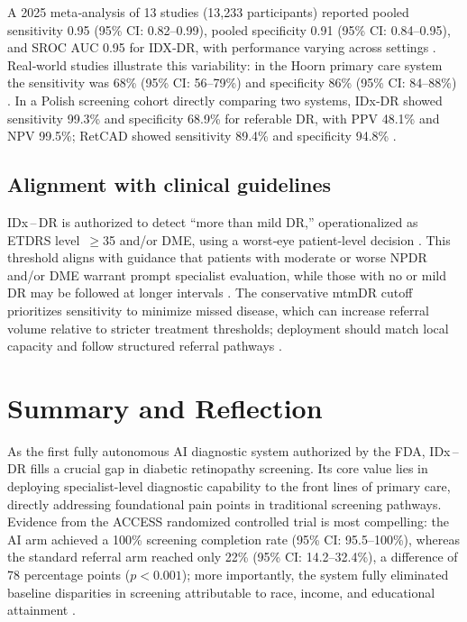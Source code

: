 \documentclass[sigconf]{acmart}
\begin{document}
A 2025 meta‐analysis of 13 studies (13{,}233 participants) reported pooled sensitivity 0.95 (95\% CI: 0.82–0.99), pooled specificity 0.91 (95\% CI: 0.84–0.95), and SROC AUC 0.95 for IDX‐DR, with performance varying across settings \citep{Khan2025AJO}. Real‐world studies illustrate this variability: in the Hoorn primary care system the sensitivity was 68\% (95\% CI: 56–79\%) and specificity 86\% (95\% CI: 84–88\%) \citep{vanDerHeijden2018Acta}. In a Polish screening cohort directly comparing two systems, IDx‐DR showed sensitivity 99.3\% and specificity 68.9\% for referable DR, with PPV 48.1\% and NPV 99.5\%; RetCAD showed sensitivity 89.4\% and specificity 94.8\% \citep{Grzybowski2025OphTher}.

\subsection{Alignment with clinical guidelines}

IDx\textsuperscript{\textregistered}\,–\,DR is authorized to detect “more than mild DR,” operationalized as ETDRS level~$\geq$35 and/or DME, using a worst‐eye patient‐level decision \citep{FDA2018DEN180001,Abramoff2018Pivotal}. This threshold aligns with guidance that patients with moderate or worse NPDR and/or DME warrant prompt specialist evaluation, while those with no or mild DR may be followed at longer intervals \citep{ADA2025S12}. The conservative mtmDR cutoff prioritizes sensitivity to minimize missed disease, which can increase referral volume relative to stricter treatment thresholds; deployment should match local capacity and follow structured referral pathways \citep{ADA2025S12,FDA2018DEN180001}.

\section{Summary and Reflection}

As the first fully autonomous AI diagnostic system authorized by the FDA, IDx\textsuperscript{\textregistered}\,–\,DR fills a crucial gap in diabetic retinopathy screening. Its core value lies in deploying specialist\mbox{-}level diagnostic capability to the front lines of primary care, directly addressing foundational pain points in traditional screening pathways. Evidence from the ACCESS randomized controlled trial is most compelling: the AI arm achieved a 100\% screening completion rate (95\% CI: 95.5–100\%), whereas the standard referral arm reached only 22\% (95\% CI: 14.2–32.4\%), a difference of 78 percentage points (\(p < 0.001\)); more importantly, the system fully eliminated baseline disparities in screening attributable to race, income, and educational attainment \citep{Wolf2024NatCommun}.
\end{document}
